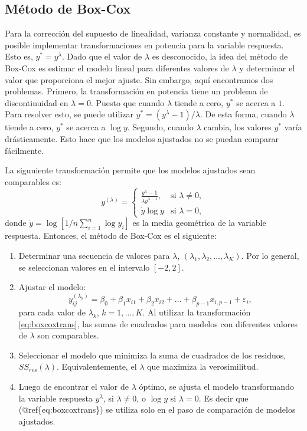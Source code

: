 \documentclass[
]{article}
\providecommand{\tightlist}{%
  \setlength{\itemsep}{0pt}\setlength{\parskip}{0pt}}
\begin{document}
\subsection{Método de Box-Cox}\label{muxe9todo-de-box-cox-1}

Para la corrección del supuesto de linealidad, varianza constante y normalidad, es posible implementar transformaciones en potencia para la variable respuesta. Esto es, \(y^{*}=y^{\lambda}\). Dado que el valor de \(\lambda\) es desconocido, la idea del método de Box-Cox es estimar el modelo lineal para diferentes valores de \(\lambda\) y determinar el valor que proporciona el mejor ajuste. Sin embargo, aquí encontramos dos problemas. Primero, la transformación en potencia tiene un problema de discontinuidad en \(\lambda=0\). Puesto que cuando \(\lambda\) tiende a cero, \(y^{*}\) se acerca a \(1\). Para resolver esto, se puede utilizar \(y^{*} = (y^{\lambda}-1)/\lambda\). De esta forma, cuando \(\lambda\) tiende a cero, \(y^{*}\) se acerca a \(\log y\). Segundo, cuando \(\lambda\) cambia, los valores \(y^{*}\) varía drásticamente. Esto hace que los modelos ajustados no se puedan comparar fácilmente.

La siguuiente transformación permite que los modelos ajustados sean comparables es:
\begin{equation}
y^{(\lambda)} = \begin{cases}
\frac{y^{\lambda}-1}{\lambda \dot{y}^{\lambda-1}}, & \mbox{si }\lambda \neq 0, \\
\dot{y}\log y & \mbox{si } \lambda=0,
\end{cases}
\label{eq:boxcoxtrans}
\end{equation}
donde \(\dot{y} = \log \left[1/n \sum_{i=1}^{n}\log y_{i}\right]\) es la media geométrica de la variable respuesta. Entonces, el método de Box-Cox es el siguiente:

\begin{enumerate}
\def\labelenumi{\arabic{enumi}.}
\tightlist
\item
  Determinar una secuencia de valores para \(\lambda\), \((\lambda_{1},\lambda_{2},\ldots,\lambda_{K})\). Por lo general, se seleccionan valores en el intervalo \([-2,2]\).
\item
  Ajustar el modelo:
  \[
  y_{ij}^{(\lambda_k)} = \beta_{0} + \beta_{1}x_{i1} + \beta_{2}x_{i2} + \ldots + \beta_{p-1}x_{i,p-1} + \varepsilon_{i},
  \]
  para cada valor de \(\lambda_{k}\), \(k=1,\ldots,K\). Al utilizar la transformación \eqref{eq:boxcoxtrans}, las sumas de cuadrados para modelos con diferentes valores de \(\lambda\) son comparables.
\item
  Seleccionar el modelo que minimiza la suma de cuadrados de los residuos, \(SS_{res}(\lambda)\). Equivalentemente, el \(\lambda\) que maximiza la verosimilitud.
\item
  Luego de encontrar el valor de \(\lambda\) óptimo, se ajusta el modelo transformando la variable respuesta \(y^{\lambda}\), si \(\lambda\neq 0\), o \(\log y\) si \(\lambda =0\). Es decir que (@ref\{eq:boxcoxtrans\}) se utiliza solo en el paso de comparación de modelos ajustados.
\end{enumerate}
\end{document}
